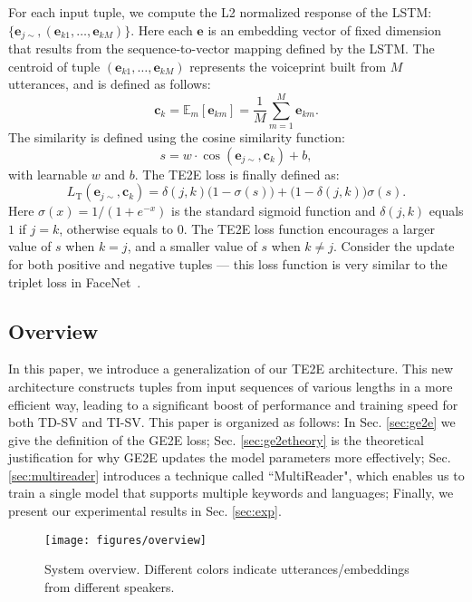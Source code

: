 \documentclass{article}
\newcommand{\ve}{\mathbf{e}}
\newcommand{\vc}{\mathbf{c}}
\newcommand{\E}{\mathbb{E}}
\begin{document}
For each input tuple, we compute the L2 normalized response of the LSTM:
$\{\ve_{j\sim}, (\ve_{k1},\dots, \ve_{kM})\}$.
Here each $\ve$ is an embedding vector of fixed dimension that results from the
sequence-to-vector mapping defined by the LSTM. The centroid of
tuple $(\ve_{k1},\dots, \ve_{kM})$ represents the voiceprint built from $M$ utterances,
and is defined as follows:
\begin{equation}
  \label{eqn:centroid}
  \vc_k=\E_m [ \ve_{km} ]=\frac{1}{M}\sum_{m=1}^M \ve_{km}.
\end{equation}
The similarity is defined using the cosine similarity function:
\begin{equation}
\label{eqn:similarity_old}
  s=w\cdot \cos(\ve_{j\sim}, \vc_{k})+b,
\end{equation}
with learnable
$w$ and $b$.  The TE2E loss is finally defined as:
\begin{equation}
  L_{\mathrm{T}}(\ve_{j\sim}, \vc_k)=\delta(j,k)\Big(1- \sigma(s)\Big)+ \Big( 1-\delta(j,k) \Big) \sigma(s).
\end{equation}
Here $\sigma(x)=1/(1+e^{-x})$ is the standard sigmoid function and
$\delta(j,k)$ equals $1$ if $j=k$, otherwise equals to $0$.
The TE2E loss function encourages a larger value of $s$ when $k=j$, and a smaller
value of $s$ when $k\neq j$. Consider the update for both positive and
negative tuples --- this loss function
is very similar to the triplet loss in FaceNet~\cite{SchroffKP15}.

\subsection{Overview}
In this paper, we introduce a generalization of our TE2E architecture.
This new architecture constructs tuples from input sequences of
various lengths in a more efficient way, leading to a significant boost of
performance and training speed for both TD-SV and TI-SV. This paper is organized
as follows: In Sec. \ref{sec:ge2e} we give the definition of the GE2E loss;
Sec. \ref{sec:ge2etheory} is the theoretical
justification for why GE2E updates the model parameters more effectively;
Sec. \ref{sec:multireader} introduces a technique called ``MultiReader",
which enables us to train a single model that supports multiple keywords and
languages; Finally, we present our experimental results in Sec. \ref{sec:exp}.

\begin{figure*}[th]
  \centering
    \texttt{[image: figures/overview]}
  \caption{
    System overview. Different colors indicate utterances/embeddings from different speakers.
  }
  \label{fig:overview}
\end{figure*}
\end{document}
